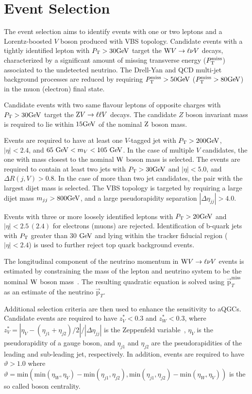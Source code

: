 
\section{Event Selection} %
\label{sec:event_selection}
The event selection aims to identify events with one or two leptons and a Lorentz-boosted $V$ boson produced with VBS topology. Candidate events with a tightly identified lepton with $P_\mathrm{T}>30\mathrm{GeV}$ target the $\mathrm{W} V \rightarrow \ell \nu V$ decays, characterized by a significant amount of missing transverse energy ($P_\mathrm{T}^{\mathrm{miss}}$) associated to the undetected neutrino. The Drell-Yan and QCD multi-jet background processes are reduced by requiring $P_\mathrm{T}^{\mathrm{miss}}>50\mathrm{GeV}$ ($P_\mathrm{T}^{\mathrm{miss}}>80\mathrm{GeV}$) in the muon (electron) final state. 

Candidate events with two same flavour leptons of opposite charges with  $P_\mathrm{T}>30\mathrm{GeV}$ target the  $\mathrm{Z} V \rightarrow \ell \ell V$ decays. The candidate $Z$ boson invariant mass is required to lie within $15\mathrm{GeV}$ of the nominal $\mathrm{Z}$ boson mass.

Events are required to have at least one $V$-tagged jet with $P_\mathrm{T}>200\mathrm{GeV}$, $|\eta|<2.4$, and $65~\mathrm{GeV} < m_{V} < 105~\mathrm{GeV}$. In the case of multiple $V$ candidates, the one with mass closest to the nominal $\mathrm{W}$ boson mass is selected.  The events are required to contain at least two jets with $P_\mathrm{T}>30\mathrm{GeV}$ and $|\eta|<5.0$, and $\Delta R(j,V)>0.8$. In the case of more than two jet candidates, the pair with the largest dijet mass is selected. The VBS topology is targeted by requiring a large dijet mass $m_{jj}>800\mathrm{GeV}$, and a large pseudorapidity separation $|\Delta \eta_{jj}|>4.0$.  

Events with three or more loosely identified leptons with $P_\mathrm{T}>20\mathrm{GeV}$ and $|\eta|<2.5\,(2.4)$ for electrons (muons) are rejected. Identification of b-quark jets with $P_\mathrm{T}$ greater than 30 $\mathrm{GeV}$ and lying within the tracker fiducial region ($\left|\eta\right|<2.4$)  is used to further reject top quark background events.   

The longitudinal component of the neutrino momentum in $\mathrm{W} V \rightarrow \ell \nu V$ events is estimated by constraining the mass of the lepton and neutrino system to be the nominal $\mathrm{W}$ boson mass~\cite{Sirunyan:2018iff}. The resulting quadratic equation is solved using $\vec{\mathrm{p}}_{T}^{\mathrm{miss}}$ as an estimate of the neutrino $\vec{\mathrm{p}}_{T}$.

Additional selection criteria are then used to enhance the sensitivity to aQGCs. Candidate events are required to have  $z_{V}^{*} < 0.3$ and $z_{W}^{*} < 0.3$, where $z_{V}^{*} = |\eta_{V}-(\eta_{j1}+\eta_{j2})/2|/|\Delta \eta_{jj}|$ is the Zeppenfeld variable~\cite{Rainwater:1996ud}, $\eta_{V}$ is the
pseudorapidity of a gauge boson, and $\eta_{j1}$ and $\eta_{j2}$ are the pseudorapidities of the leading and sub-leading jet, respectively. In addition, events are required to have $\vartheta>1.0$ where $\vartheta = \mathrm{min}(\mathrm{min}(\eta_{W},\eta_{V})-\mathrm{min}(\eta_{j1},\eta_{j2}),\mathrm{min}(\eta_{j1},\eta_{j2})-\mathrm{min}(\eta_{W},\eta_{V}))$ is the so called boson centrality. 

